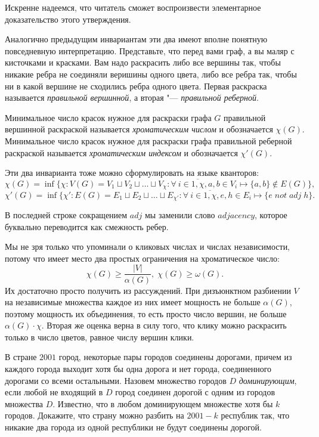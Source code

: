 	Искренне надеемся, что читатель сможет воспроизвести элементарное доказательство этого утверждения.
	
	
	Аналогично предыдущим инвариантам эти два имеют вполне понятную повседневную интерпретацию. Представьте, что перед вами граф, а вы маляр с кисточками и красками. Вам надо раскрасить либо все вершины так, чтобы никакие ребра не соединяли веришины одного цвета, либо все ребра так, чтобы ни в какой вершине не сходились ребра одного цвета. Первая раскраска называется \emph{правильной вершинной}, а вторая "--- \emph{правильной реберной}.
	
\begin{definition}
	Минимальное число красок нужное для раскраски графа $G$ правильной вершинной раскраской называется \emph{хроматическим числом} и обозначается $\chi(G)$. Минимальное число красок нужное для раскраски графа правильной реберной раскраской называется \emph{хроматическим индексом} и обозначается $\chi'(G)$. 
\end{definition}
	
	Эти два инварианта тоже можно сформулировать на языке кванторов:
	$$\chi(G) = \inf \lbrace \chi \colon V(G) = V_1 \sqcup V_2 \sqcup \dots \sqcup V_\chi \colon \forall \!\ i \in \overline{1, \chi}, a, b \in V_i \mapsto \lbrace a, b \rbrace \notin E(G)\rbrace,$$
	$$\chi'(G) = \inf \lbrace \chi' \colon E(G) = E_1 \sqcup E_2 \sqcup \dots \sqcup E_{\chi'} \colon \forall \!\ i \in \overline{1, \chi}, e, h \in E_i \mapsto \lbrace e \; not \; adj \; h\rbrace.$$
	
	В последней строке сокращением $adj$ мы заменили слово $adjacency$, которое буквально переводится как смежность ребер.
	
	Мы не зря только что упоминали о кликовых числах и числах независимости, потому что имеет место два простых ограничения на хроматическое число:
	$$\chi(G) \geqslant \frac{|V|}{\alpha(G)}, \; \chi(G) \geqslant \omega(G).$$
	Их достаточно просто получить из рассуждений. При дизъюнктном разбиении $V$ на независимые множества каждое из них имеет мощность не больше $\alpha(G)$, поэтому мощность их объединения, то есть просто число вершин, не больше $\alpha(G) \cdot \chi$. Вторая же оценка верна в силу того, что клику можно раскрасить только в число цветов, равное числу вершин клики.
	

\begin{exersize}
	В стране $2001$ город, некоторые пары городов соединены дорогами, причем из каждого города выходит хотя бы одна дорога и нет города, соединенного дорогами со всеми остальными. Назовем множество городов $D$ \emph{доминирующим}, если любой не входящий в $D$ город соединен дорогой с одним из городов множества $D$. Известно, что в любом доминирующем множестве хотя бы $k$ городов. Докажите, что страну можно разбить на $2001-k$ республик так, что никакие два города из одной республики не будут соединены дорогой.
\end{exersize}	 

